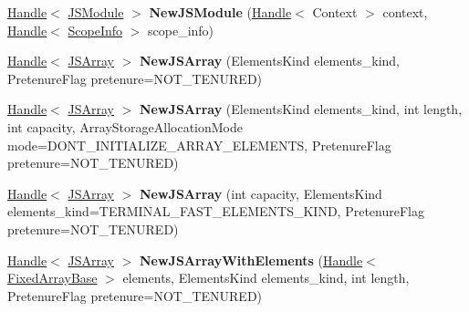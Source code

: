 \begin{DoxyCompactItemize}
\item 
\hypertarget{classv8_1_1internal_1_1_v8___f_i_n_a_l_aa4a6a08bc42e1c5d05f148844168f41c}{}\hyperlink{classv8_1_1internal_1_1_handle}{Handle}$<$ \hyperlink{classv8_1_1internal_1_1_j_s_module}{J\+S\+Module} $>$ {\bfseries New\+J\+S\+Module} (\hyperlink{classv8_1_1internal_1_1_handle}{Handle}$<$ Context $>$ context, \hyperlink{classv8_1_1internal_1_1_handle}{Handle}$<$ \hyperlink{classv8_1_1internal_1_1_scope_info}{Scope\+Info} $>$ scope\+\_\+info)\label{classv8_1_1internal_1_1_v8___f_i_n_a_l_aa4a6a08bc42e1c5d05f148844168f41c}

\item 
\hypertarget{classv8_1_1internal_1_1_v8___f_i_n_a_l_a484e89bf4daaef65168bf24140483324}{}\hyperlink{classv8_1_1internal_1_1_handle}{Handle}$<$ \hyperlink{classv8_1_1internal_1_1_j_s_array}{J\+S\+Array} $>$ {\bfseries New\+J\+S\+Array} (Elements\+Kind elements\+\_\+kind, Pretenure\+Flag pretenure=N\+O\+T\+\_\+\+T\+E\+N\+U\+R\+E\+D)\label{classv8_1_1internal_1_1_v8___f_i_n_a_l_a484e89bf4daaef65168bf24140483324}

\item 
\hypertarget{classv8_1_1internal_1_1_v8___f_i_n_a_l_a25a64691e8900497434577fea5b02155}{}\hyperlink{classv8_1_1internal_1_1_handle}{Handle}$<$ \hyperlink{classv8_1_1internal_1_1_j_s_array}{J\+S\+Array} $>$ {\bfseries New\+J\+S\+Array} (Elements\+Kind elements\+\_\+kind, int length, int capacity, Array\+Storage\+Allocation\+Mode mode=D\+O\+N\+T\+\_\+\+I\+N\+I\+T\+I\+A\+L\+I\+Z\+E\+\_\+\+A\+R\+R\+A\+Y\+\_\+\+E\+L\+E\+M\+E\+N\+T\+S, Pretenure\+Flag pretenure=N\+O\+T\+\_\+\+T\+E\+N\+U\+R\+E\+D)\label{classv8_1_1internal_1_1_v8___f_i_n_a_l_a25a64691e8900497434577fea5b02155}

\item 
\hypertarget{classv8_1_1internal_1_1_v8___f_i_n_a_l_a584a3bc2af9f6e53b12911978ccca9e4}{}\hyperlink{classv8_1_1internal_1_1_handle}{Handle}$<$ \hyperlink{classv8_1_1internal_1_1_j_s_array}{J\+S\+Array} $>$ {\bfseries New\+J\+S\+Array} (int capacity, Elements\+Kind elements\+\_\+kind=T\+E\+R\+M\+I\+N\+A\+L\+\_\+\+F\+A\+S\+T\+\_\+\+E\+L\+E\+M\+E\+N\+T\+S\+\_\+\+K\+I\+N\+D, Pretenure\+Flag pretenure=N\+O\+T\+\_\+\+T\+E\+N\+U\+R\+E\+D)\label{classv8_1_1internal_1_1_v8___f_i_n_a_l_a584a3bc2af9f6e53b12911978ccca9e4}

\item 
\hypertarget{classv8_1_1internal_1_1_v8___f_i_n_a_l_a7a6eb041660998f215f495bfa4eab8ab}{}\hyperlink{classv8_1_1internal_1_1_handle}{Handle}$<$ \hyperlink{classv8_1_1internal_1_1_j_s_array}{J\+S\+Array} $>$ {\bfseries New\+J\+S\+Array\+With\+Elements} (\hyperlink{classv8_1_1internal_1_1_handle}{Handle}$<$ \hyperlink{classv8_1_1internal_1_1_fixed_array_base}{Fixed\+Array\+Base} $>$ elements, Elements\+Kind elements\+\_\+kind, int length, Pretenure\+Flag pretenure=N\+O\+T\+\_\+\+T\+E\+N\+U\+R\+E\+D)\label{classv8_1_1internal_1_1_v8___f_i_n_a_l_a7a6eb041660998f215f495bfa4eab8ab}


\end{DoxyCompactItemize}
